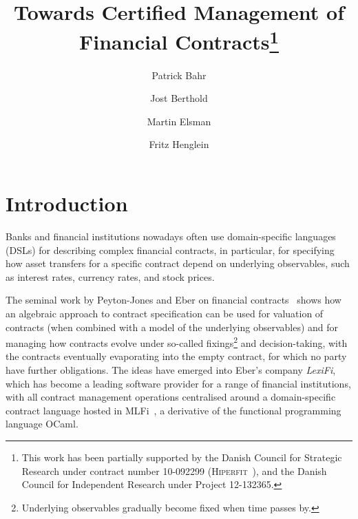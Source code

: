 \documentclass[a4paper,debug,twocolumn]{easychair}
\theoremstyle{plain}
\begin{document}
\title{Towards Certified Management of Financial Contracts\thanks{This
    work has been partially supported by the Danish Council for
    Strategic Research under contract number 10-092299
    (\textsc{Hiperfit}~\cite{TFP11Hiperfit}), and the Danish Council
    for Independent Research under Project 12-132365.}}


\author{Patrick Bahr
    \and
        Jost Berthold 
    \and 
        Martin Elsman 
    \and 
        Fritz Henglein\\
}



\clearpage
\maketitle

\section{Introduction}

Banks and financial institutions nowadays often use domain-specific
languages (DSLs) for describing complex financial contracts, in
particular, for specifying how asset transfers for a specific contract
depend on underlying observables, such as interest rates, currency
rates, and stock prices.

The seminal work by Peyton-Jones and Eber on financial
contracts~\cite{SPJ2000} shows how an algebraic approach to contract
specification can be used for valuation of contracts (when combined
with a model of the underlying observables) and for managing how
contracts evolve under so-called fixings\footnote{Underlying
  observables gradually become fixed when time passes by.} and
decision-taking, with the contracts eventually evaporating into the
empty contract, for which no party have further obligations. The ideas
have emerged into Eber's company \emph{LexiFi}, which has become a
leading software provider for a range of financial institutions, with
all contract management operations centralised around a
domain-specific contract language hosted in MLFi~\cite{MLFi}, a
derivative of the functional programming language OCaml.
\end{document}
